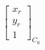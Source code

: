 \documentclass[preview]{standalone}
\begin{document}
\begin{align*}
\begin{bmatrix}  x_r\\  y_r\\1\end{bmatrix}_{C_0}
\end{align*}
\end{document}
